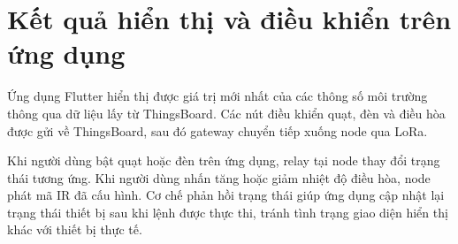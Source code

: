 \section{Kết quả hiển thị và điều khiển trên ứng dụng}
Ứng dụng Flutter hiển thị được giá trị mới nhất của các thông số môi trường thông qua dữ liệu lấy từ ThingsBoard. Các nút điều khiển quạt, đèn và điều hòa được gửi về ThingsBoard, sau đó gateway chuyển tiếp xuống node qua LoRa.

Khi người dùng bật quạt hoặc đèn trên ứng dụng, relay tại node thay đổi trạng thái tương ứng. Khi người dùng nhấn tăng hoặc giảm nhiệt độ điều hòa, node phát mã IR đã cấu hình. Cơ chế phản hồi trạng thái giúp ứng dụng cập nhật lại trạng thái thiết bị sau khi lệnh được thực thi, tránh tình trạng giao diện hiển thị khác với thiết bị thực tế.

